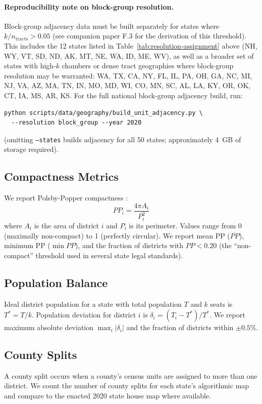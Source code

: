 \paragraph{Reproducibility note on block-group resolution.}
Block-group adjacency data must be built separately for states where
$k/n_{\mathrm{tracts}} > 0.05$ (see companion paper F.3 for the derivation
of this threshold). This includes the 12 states listed in
Table~\ref{tab:resolution-assignment} above (NH, WY, VT, SD, ND, AK, MT,
NE, WA, ID, ME, WV), as well as a broader set of states with high-$k$
chambers or dense tract geographies where block-group resolution may be
warranted: WA, TX, CA, NY, FL, IL, PA, OH, GA, NC, MI, NJ, VA, AZ, MA,
TN, IN, MO, MD, WI, CO, MN, SC, AL, LA, KY, OR, OK, CT, IA, MS, AR, KS.
For the full national block-group adjacency build, run:
\begin{verbatim}
python scripts/data/geography/build_unit_adjacency.py \
  --resolution block_group --year 2020
\end{verbatim}
(omitting \texttt{--states} builds adjacency for all 50 states; approximately
4~GB of storage required).

\subsection{Compactness Metrics}
\label{sec:methodology:metrics}

We report Polsby-Popper compactness \citep{polsby1991third}:
\[
  PP_i = \frac{4\pi A_i}{P_i^2}
\]
where $A_i$ is the area of district $i$ and $P_i$ is its perimeter.
Values range from 0 (maximally non-compact) to 1 (perfectly circular).
We report mean PP ($\overline{PP}$), minimum PP ($\min PP$), and the
fraction of districts with $PP < 0.20$ (the ``non-compact'' threshold
used in several state legal standards).

\subsection{Population Balance}
\label{sec:methodology:balance}

Ideal district population for a state with total population $T$ and $k$ seats
is $T^* = T/k$. Population deviation for district $i$ is
$\delta_i = (T_i - T^*)/T^*$. We report maximum absolute deviation
$\max_i |\delta_i|$ and the fraction of districts within $\pm 0.5\%$.

\subsection{County Splits}
\label{sec:methodology:splits}

A county split occurs when a county's census units are assigned to more
than one district. We count the number of county splits for each state's
algorithmic map and compare to the enacted 2020 state house map where available.
